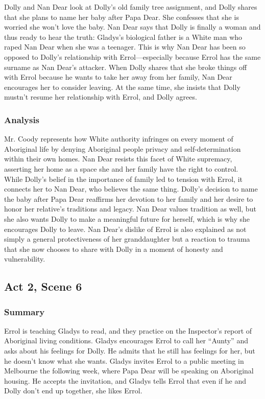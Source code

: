 \documentclass[a4paper]{article}
\begin{document}
Dolly and Nan Dear look at Dolly’s old family tree assignment,
and Dolly shares that she plans to name her baby after Papa
Dear. She confesses that she is worried she won’t love the
baby. Nan Dear says that Dolly is finally a woman and thus
ready to hear the truth: Gladys’s biological father is a White
man who raped Nan Dear when she was a teenager. This is why
Nan Dear has been so opposed to Dolly’s relationship with
Errol––especially because Errol has the same surname as Nan
Dear’s attacker. When Dolly shares that she broke things off
with Errol because he wants to take her away from her family,
Nan Dear encourages her to consider leaving. At the same
time, she insists that Dolly mustn’t resume her relationship
with Errol, and Dolly agrees.\\

\subsubsection{Analysis}
Mr. Coody represents how White authority infringes on every
moment of Aboriginal life by denying Aboriginal people privacy and
self-determination within their own homes. Nan Dear resists this
facet of White supremacy, asserting her home as a space she and
her family have the right to control.\\

While Dolly’s belief in the importance of family led to tension with
Errol, it connects her to Nan Dear, who believes the same thing.
Dolly’s decision to name the baby after Papa Dear reaffirms her
devotion to her family and her desire to honor her relative’s
traditions and legacy. Nan Dear values tradition as well, but she also
wants Dolly to make a meaningful future for herself, which is why
she encourages Dolly to leave. Nan Dear’s dislike of Errol is also
explained as not simply a general protectiveness of her
granddaughter but a reaction to trauma that she now chooses to
share with Dolly in a moment of honesty and vulnerability.\\

\subsection{Act 2, Scene 6}
\subsubsection{Summary}
Errol is teaching Gladys to read, and they practice on the
Inspector’s report of Aboriginal living conditions. Gladys
encourages Errol to call her “Aunty” and asks about his feelings
for Dolly. He admits that he still has feelings for her, but he
doesn’t know what she wants. Gladys invites Errol to a public
meeting in Melbourne the following week, where Papa Dear
will be speaking on Aboriginal housing. He accepts the
invitation, and Gladys tells Errol that even if he and Dolly don’t
end up together, she likes Errol.\\
\end{document}
